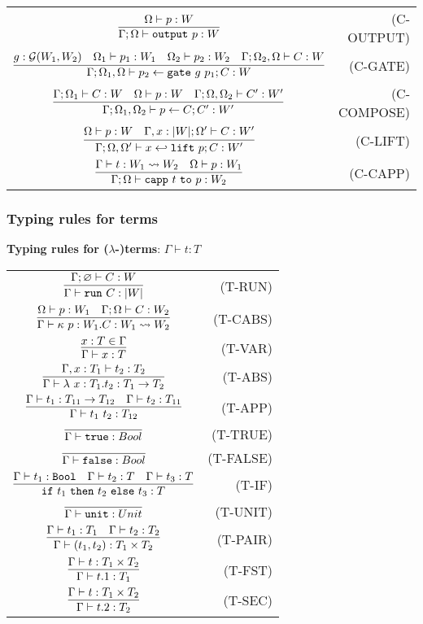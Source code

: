 \renewcommand\arraystretch{3} 
\begin{longtable}[c]{cr}
  $\infer{\Gamma;\Omega\vdash \toutput\ p:W}{\Omega\vdash p : W}$ &(C-OUTPUT)\\
  $\infer{\Gamma;\Omega_1,\Omega\vdash p_2 \from \gate\ g\ p_1 ; C:W}{g:\calG(W_1, W_2) &\Omega_1\vdash p_1:W_1 &\Omega_2\vdash p_2:W_2 &\Gamma ; \Omega_2,\Omega \vdash C:W}$ &(C-GATE)\\
  $\infer{\Gamma;\Omega_1,\Omega_2\vdash p \from C ; C':W'}{\Gamma;\Omega_1\vdash C:W &\Omega \vdash p:W &\Gamma;\Omega,\Omega_2 \vdash C':W'}$ &(C-COMPOSE)\\
  $\infer{\Gamma;\Omega,\Omega'\vdash x \hookleftarrow \lift\ p ; C:W'}{\Omega\vdash p:W &\Gamma,x:|W|;\Omega' \vdash C:W'}$ &(C-LIFT)\\
  $\infer{\Gamma;\Omega\vdash \capp\ t\ \mathtt{to}\ p : W_2}{\Gamma\vdash t:W_1\leadsto W_2 &\Omega\vdash p:W_1}$ &(C-CAPP)\\
  
\end{longtable}

\subsubsection{Typing rules for terms}

\noindent \textbf{Typing rules for ($\lambda$-)terms}: $\boxed{\Gamma\vdash t:T}$

\renewcommand\arraystretch{3}
\begin{longtable}[c]{cr}
  $\infer{\Gamma\vdash \trun\ C : |W| }{\Gamma;\varnothing \vdash C:W}$ &(T-RUN)\\
  $\infer{\Gamma\vdash \kappa\ p:W_1 . C: W_1\leadsto W_2 }{\Omega\vdash p:W_1 &\Gamma;\Omega\vdash C:W_2}$ &(T-CABS)\\
  $\infer{\Gamma\vdash x:T}{x:T\in \Gamma}$ &(T-VAR)\\
  $\infer{\Gamma\vdash \lambda\ x:T_1.t_2 : T_1\to T_2}{\Gamma,x:T_1 \vdash t_2:T_2}$ &(T-ABS)\\
  $\infer{\Gamma\vdash t_1\ t_2 : T_{12}}{\Gamma\vdash t_1:T_{11}\to T_{12} & \Gamma\vdash t_2:T_{11}}$ &(T-APP)\\
  $\infer{\Gamma\vdash\true : Bool}{}$ &(T-TRUE)\\
  $\infer{\Gamma\vdash\false : Bool}{}$ &(T-FALSE)\\
  $\infer{\tif\ t_1\ \tthen\ t_2\ \telse\ t_3 : T}{\Gamma\vdash t_1:\Bool &\Gamma\vdash t_2:T &\Gamma\vdash t_3:T}$ &(T-IF)\\
  $\infer{\Gamma\vdash\unit : Unit}{}$ &(T-UNIT)\\
  $\infer{\Gamma\vdash (t_1,t_2) : T_1\times T_2}{\Gamma\vdash t_1:T_1 &\Gamma\vdash t_2:T_2}$ &(T-PAIR)\\
  $\infer{\Gamma\vdash t.1 : T_1}{\Gamma\vdash t : T_1\times T_2}$ &(T-FST)\\
  $\infer{\Gamma\vdash t.2 : T_2}{\Gamma\vdash t : T_1\times T_2}$ &(T-SEC)\\
\end{longtable}

